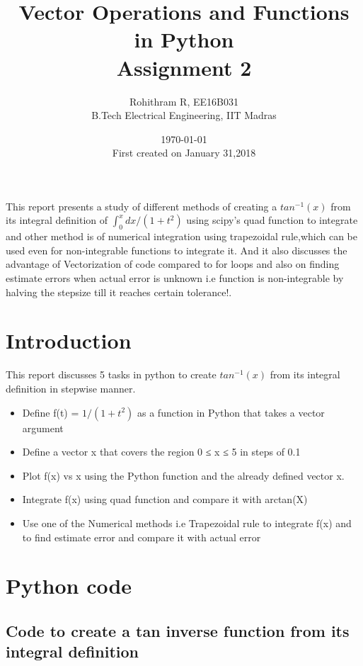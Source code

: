 \documentclass[a4paper]{article}
\title{Vector Operations and Functions in Python \\ Assignment 2}
\author{Rohithram R, EE16B031 \\ B.Tech Electrical Engineering, IIT Madras}
\date{\today \\ First created on January 31,2018}
\begin{document}
    
    
    \maketitle
    
	\begin{abstract}    
	\end{abstract}
	This report presents a study of different methods of creating a  $tan^{-1}(x)$ from its integral definition of $\int_{0}^{x} dx/(1+t^{2})$ using scipy's quad function to integrate and other method is of numerical integration using trapezoidal rule,which can be used even for non-integrable functions to integrate it.
	And it also discusses the advantage of Vectorization of code compared to for loops and also on finding estimate errors when actual error is unknown i.e function is non-integrable by halving the stepsize till it reaches certain tolerance!.	
	\section{Introduction}
	This report discusses 5 tasks in python to create  $tan^{-1}(x)$ from its integral definition in stepwise manner.

	\begin{itemize}
	\item Define f(t) = $1/(1+t^{2})$ as a function in Python that takes a
	vector argument
	\item Define a vector x that covers the region 0 ≤ x ≤ 5 in steps of 0.1 
	 \item Plot f(x) vs x using the Python function and the already defined vector x. 
	\item Integrate f(x) using quad function and compare it with arctan(X)
	\item  Use one of the Numerical methods i.e Trapezoidal rule to integrate f(x) and to find estimate error and compare it with actual error  

	\end{itemize}
	
    \section{Python code}
    \subsection{Code to create a tan inverse function from its integral definition}
\end{document}
